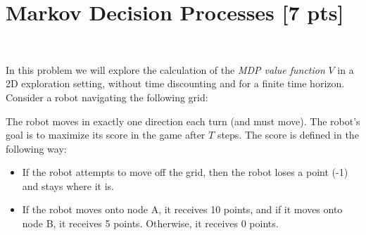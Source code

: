\documentclass[submit]{harvardml}
\begin{document}
\newpage
\section*{Markov Decision Processes [7 pts]}
\begin{problem}
  ~

  
  \noindent In this problem we will explore the calculation of the \emph{MDP value function} $V$  in a 2D exploration setting, without time discounting and
for a finite time horizon. 
%
Consider a robot navigating the following grid:\\
  \begin{center}
\end{center}
The robot moves in exactly one direction each turn (and must move). The robot's goal is to maximize its score in the game after $T$ steps. The
score is defined in the following way:
%
\begin{itemize}
  \item If the robot attempts to move off the grid, then the robot loses a point (-1) and stays where it is.
  \item If the robot moves onto node A, it receives 10 points, and if it moves onto node B, it receives 5 points. Otherwise, it receives 0 points.
\end{itemize}


\end{problem}
\end{document}
